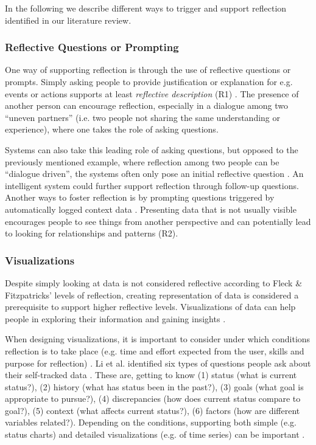 In the following we describe different ways to trigger and support reflection identified in our literature review. 

\subsubsection{Reflective Questions or Prompting}
One way of supporting reflection is through the use of reflective questions or prompts. Simply asking people to provide justification or explanation for e.g. events or actions supports at least \textit{reflective description} (R1) \cite{Fleck}. The presence of another person can encourage reflection, especially in a dialogue among two “uneven partners” (i.e. two people not sharing the same understanding or experience), where one takes the role of asking questions. 

Systems can also take this leading role of asking questions, but opposed to the previously mentioned example, where reflection among two people can be “dialogue driven”, the systems often only pose  an initial reflective question \cite{Mols}. An intelligent system could further support reflection through follow-up questions. Another ways to foster reflection is by prompting questions triggered by automatically logged context data \cite{Fleck}. Presenting data that is not usually visible encourages people to see things from another perspective and can potentially lead to looking for relationships and patterns (R2). 

\subsubsection{Visualizations}
Despite simply looking at data is not considered reflective according to Fleck \& Fitzpatricks’ levels of reflection, creating representation of data is considered a prerequisite to support higher reflective levels. Visualizations of data can help people in exploring their information and gaining insights \cite{Li2010, Choe2014}. 

When designing visualizations, it is important to consider under which conditions reflection is to take place (e.g. time and effort expected from the user, skills and purpose for reflection) \cite{Cuttone, Muller}. Li et al. identified six types of questions people ask about their self-tracked data \cite{Li2011}. These are, getting to know (1) status (what is current status?), (2) history (what has status been in the past?), (3) goals (what goal is appropriate to pursue?), (4) discrepancies (how does current status compare to goal?), (5) context (what affects current status?), (6) factors (how are different variables related?). Depending on the conditions, supporting both simple (e.g. status charts) and detailed visualizations (e.g. of time series) can be important \cite{Muller, Cutone}.

